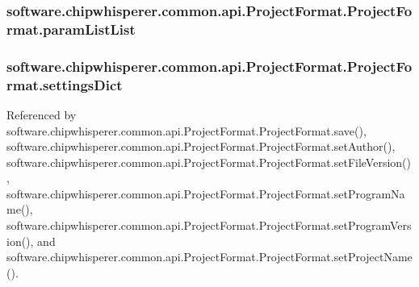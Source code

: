 \hypertarget{classsoftware_1_1chipwhisperer_1_1common_1_1api_1_1ProjectFormat_1_1ProjectFormat_aa1f0fad7e66a21ac93bf006f2a693a3d}{}
\subsubsection[{param\+List\+List}]{\setlength{\rightskip}{0pt plus 5cm}software.\+chipwhisperer.\+common.\+api.\+Project\+Format.\+Project\+Format.\+param\+List\+List}\label{classsoftware_1_1chipwhisperer_1_1common_1_1api_1_1ProjectFormat_1_1ProjectFormat_aa1f0fad7e66a21ac93bf006f2a693a3d}
\hypertarget{classsoftware_1_1chipwhisperer_1_1common_1_1api_1_1ProjectFormat_1_1ProjectFormat_a519aecc8872b92ca23ad591536d01748}{}
\subsubsection[{settings\+Dict}]{\setlength{\rightskip}{0pt plus 5cm}software.\+chipwhisperer.\+common.\+api.\+Project\+Format.\+Project\+Format.\+settings\+Dict}\label{classsoftware_1_1chipwhisperer_1_1common_1_1api_1_1ProjectFormat_1_1ProjectFormat_a519aecc8872b92ca23ad591536d01748}


Referenced by software.\+chipwhisperer.\+common.\+api.\+Project\+Format.\+Project\+Format.\+save(), software.\+chipwhisperer.\+common.\+api.\+Project\+Format.\+Project\+Format.\+set\+Author(), software.\+chipwhisperer.\+common.\+api.\+Project\+Format.\+Project\+Format.\+set\+File\+Version(), software.\+chipwhisperer.\+common.\+api.\+Project\+Format.\+Project\+Format.\+set\+Program\+Name(), software.\+chipwhisperer.\+common.\+api.\+Project\+Format.\+Project\+Format.\+set\+Program\+Version(), and software.\+chipwhisperer.\+common.\+api.\+Project\+Format.\+Project\+Format.\+set\+Project\+Name().

